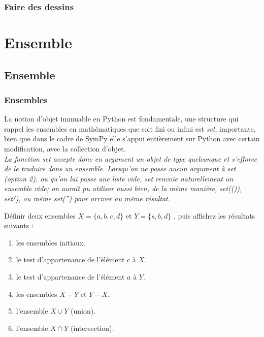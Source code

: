 \documentclass[11pt,fleqn]{book} %
\begin{document}
\subsection{Faire des dessins}



\chapter{Ensemble}

\section{Ensemble}

\subsection{Ensembles}
La notion d'objet immuable en Python est fondamentale,  une structure qui rappel les ensembles en mathématiques que soit fini ou infini est \textit{set}, importante, bien que
dans le cadre de SymPy elle s'appui entièrement sur Python avec certain modification, avec la collection d'objet.
\\

\textit{La fonction set accepte donc en argument un objet de type quelconque et s'efforce de le traduire dans un ensemble. Lorsqu'on ne passe aucun argument à set (option 2), ou qu'on lui passe une liste vide, set renvoie naturellement un ensemble vide; on aurait pu utiliser aussi bien, de la même manière, set(()), set({}), ou même set('') pour arriver au même résultat.}

\begin{exercise}
		Définir deux ensembles $X = \lbrace a, b, c, d\rbrace$ et  $Y = \lbrace s, b, d\rbrace$ , puis 			affichez les résultats suivants :
 		\begin{enumerate}
  			 \item les ensembles initiaux.
  			 \item le test d’appartenance de l’élément $c$ à $X$.
  			 \item le test d’appartenance de l’élément $a$ à $Y$.
  			 \item les ensembles $X - Y$ et $Y - X$.
  			 \item l’ensemble $X \cup Y$ (union).
  			 \item l'ensemble $X \cap Y$ (intersection).
	 \end{enumerate}
\end{exercise}
\end{document}
